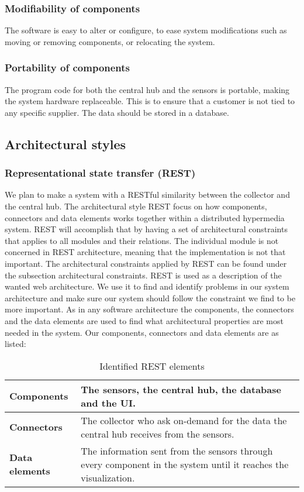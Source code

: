 \documentclass[../document.tex]{subfiles}
\begin{document}
\subsubsection{Modifiability of components}
The software is easy to alter or configure, to ease system modifications such as moving or removing components, or relocating the system.

\subsubsection{Portability of components}
The program code for both the central hub and the sensors is portable, making the system hardware replaceable. This is to ensure that a customer is not tied to any specific supplier. The data should be stored in a database.

\subsection{Architectural styles}
\subsubsection{Representational state transfer (REST)}
We plan to make a system with a RESTful similarity between the collector and the central hub. The architectural style REST focus on how components, connectors and data elements works together within a distributed hypermedia system. REST will accomplish that by having a set of architectural constraints that applies to all modules and their relations. The individual module is not concerned in REST architecture, meaning that the implementation is not that important. The architectural constraints applied by REST can be found under the subsection architectural constraints. REST is used as a description of the wanted web architecture. We use it to find and identify problems in our system architecture and make sure our system should follow the constraint we find to be more important. As in any software architecture the components, the connectors and the data elements are used to find what architectural properties are most needed in the system. Our components, connectors and data elements are as listed:

\begin{table}[H]
	\caption{Identified REST elements}
	\begin{tabularx}{\textwidth}{|X|X|}
		\hline
		\textbf{Components}		& The sensors, the central hub, the database and the UI.  \\ \hline
		\textbf{Connectors}		& The collector who ask on-demand for the data the central hub receives from the sensors.  \\ \hline
		\textbf{Data elements}	& The information sent from the sensors through every component in the system until it reaches  the visualization.  \\ \hline
	\end{tabularx}
\end{table}
\end{document}
